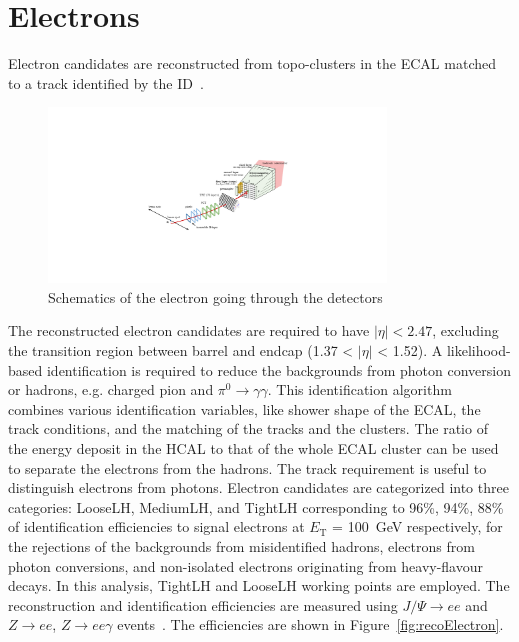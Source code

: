\section{Electrons}
Electron candidates are reconstructed from topo-clusters in the ECAL matched to a track identified by the ID~\cite{ATL-PHYS-PUB-2017-022}.
\begin{figure}[tbp]
\begin{center}
 \includegraphics[width=0.80\textwidth,keepaspectratio]{figures/Reconstruction/electronPath}
\caption{
Schematics of the electron going through the detectors
}
\label{fig:electronPath}
\end{center}
\end{figure}
The reconstructed electron candidates are required to have $|\eta|<2.47$, excluding the transition region between barrel and endcap (1.37 < $|\eta|$ < 1.52).
A likelihood-based identification is required to reduce the backgrounds from photon conversion or hadrons, e.g. charged pion and $\pi^0 \rightarrow \gamma \gamma$. 
This identification algorithm combines various identification variables, like shower shape of the ECAL, the track conditions, and the matching of the tracks and the clusters. 
The ratio of the energy deposit in the HCAL to that of the whole ECAL cluster can be used to separate the electrons from the hadrons. 
The track requirement is useful to distinguish electrons from photons.
Electron candidates are categorized into three categories: LooseLH, MediumLH, and TightLH corresponding to 96\%, 94\%, 88\% of identification efficiencies to signal electrons at $E_\mathrm{T}$ = 100~GeV respectively, for the rejections of the backgrounds from misidentified hadrons, electrons from photon conversions, and non-isolated electrons originating from heavy-flavour decays. 
In this analysis, TightLH and LooseLH working points are employed.
The reconstruction and identification efficiencies are measured using  $J/\Psi \rightarrow ee$ and $Z\rightarrow ee$, $Z\rightarrow ee\gamma$ events~\cite{PERF-2017-01}. The efficiencies are shown in Figure~\ref{fig:recoElectron}. 
